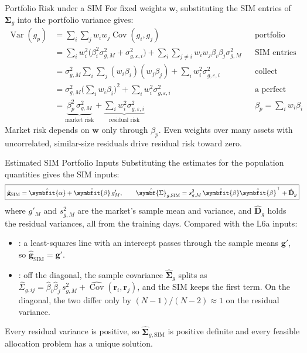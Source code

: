 \documentclass[aspectratio=169,11pt]{beamer}
\newcommand{\Var}{\operatorname{Var}}
\newcommand{\Cov}{\operatorname{Cov}}
\newcommand{\bg}{\mathbf{g}}
\newcommand{\bw}{\mathbf{w}}
\newcommand{\br}{\mathbf{r}}
\newcommand{\bal}{\symbfit{\alpha}}
\newcommand{\bbe}{\symbfit{\beta}}
\newcommand{\Sig}{\symbf{\Sigma}_{g}}
\newcommand{\Sg}{\hat{\symbf{\Sigma}}_{g}}
\newcommand{\SigSIM}{\hat{\symbf{\Sigma}}_{g,\mathrm{SIM}}}
\newcommand{\gSIM}{\hat{\bg}_{\mathrm{SIM}}}
\begin{document}
\begin{frame}{Portfolio Risk under a SIM}
  For fixed weights $\bw$, substituting the SIM entries of $\Sig$ into the
  portfolio variance gives:
  \[
    \begin{aligned}
      \Var(g_p)&=\textstyle\sum_{i}\sum_{j}w_iw_j\Cov(g_i,g_j)
        &&\text{portfolio variance (L6a)}\\
      &=\textstyle\sum_{i}w_i^2\bigl(\beta_i^2\sigma^2_{g,M}+\sigma^2_{g,\varepsilon,i}\bigr)
        +\sum_{i}\sum_{j\neq i}w_iw_j\beta_i\beta_j\sigma^2_{g,M}
        &&\text{SIM entries}\\
      &=\textstyle\sigma^2_{g,M}\sum_{i}\sum_{j}(w_i\beta_i)(w_j\beta_j)
        +\sum_{i}w_i^2\sigma^2_{g,\varepsilon,i}
        &&\text{collect market terms}\\
      &=\textstyle\sigma^2_{g,M}\bigl(\sum_{i}w_i\beta_i\bigr)^2
        +\sum_{i}w_i^2\sigma^2_{g,\varepsilon,i}
        &&\text{a perfect square}\\
      &=\underbrace{\beta_p^2\,\sigma^2_{g,M}}_{\text{market risk}}
        +\underbrace{\textstyle\sum_{i}w_i^2\sigma^2_{g,\varepsilon,i}}_{\text{residual risk}}
        &&\beta_p=\textstyle\sum_{i}w_i\beta_i
    \end{aligned}
  \]
  Market risk depends on $\bw$ only through $\beta_p$. Even weights over many
  assets with uncorrelated, similar-size residuals drive residual risk toward zero.
\end{frame}

\begin{frame}{Estimated SIM Portfolio Inputs}
  Substituting the estimates for the population quantities gives the SIM inputs:
  \[
    \boxed{\gSIM=\hat{\bal}+\hat{\bbe}\,g'_M,\qquad
      \SigSIM=s^2_{g,M}\,\hat{\bbe}\hat{\bbe}^{\top}+\hat{\mathbf D}_g}
  \]
  where $g'_M$ and $s^2_{g,M}$ are the market's sample mean and variance, and
  $\hat{\mathbf D}_g$ holds the residual variances, all from the training days.
  Compared with the L6a inputs:
  \begin{itemize}\setlength{\itemsep}{0.25em}
    \item {}: a least-squares
      line with an intercept passes through the sample means $\bg'$, so $\gSIM=\bg'$.
    \item {}: off the
      diagonal, the sample covariance $\Sg$ splits as
      $\hat\Sigma_{g,ij}=\hat\beta_i\hat\beta_j\,s^2_{g,M}+\widehat{\Cov}(\br_i,\br_j)$,
      and the SIM keeps the first term. On the diagonal, the two differ only by
      $(N-1)/(N-2)\approx1$ on the residual variance.
  \end{itemize}
  Every residual variance is positive, so $\SigSIM$ is positive definite and
  every feasible allocation problem has a unique solution.
\end{frame}
\end{document}
